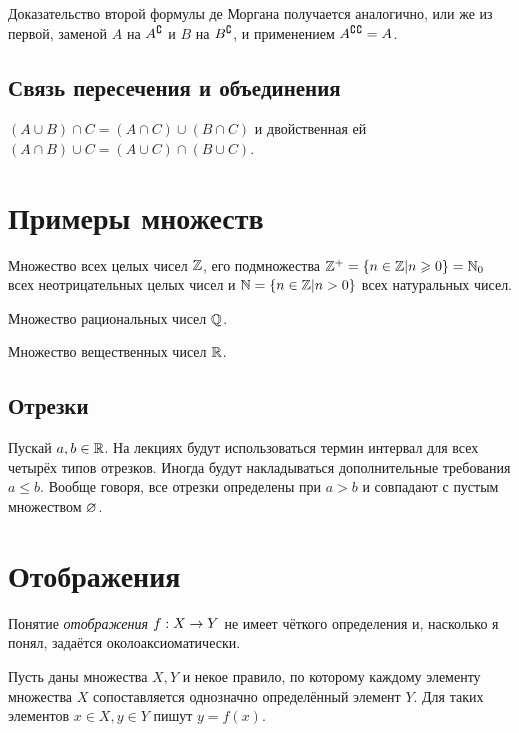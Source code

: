 \documentclass[a4paper]{report}
\begin{document}
    Доказательство второй формулы де Моргана получается аналогично, или же из первой, заменой $A$ на $A{}^\complement$ и $B$ на $B{}^\complement$, и применением $A{}^\complement{}^\complement = A$.

    \subsection{Связь пересечения и объединения} $(A \cup B) \cap C = (A \cap C) \cup (B \cap C)$ и двойственная ей $(A \cap B) \cup C = (A \cup C) \cap (B \cup C)$.


    \section{Примеры множеств}

    Множество всех целых чисел $\mathbb{Z}$, его подмножества $\mathbb{Z}^+ = \{ n \in \mathbb{Z} | n \geqslant 0 \} = \mathbb{N}_0$ всех неотрицательных целых чисел и $\mathbb{N} = \{ n \in \mathbb{Z} | n > 0 \}$ всех натуральных чисел.

    Множество рациональных чисел $\mathbb{Q}$.

    Множество вещественных чисел $\mathbb{R}$.

    \subsection{Отрезки}

    Пускай $a, b \in \mathbb{R}$. 
    На лекциях будут использоваться термин интервал для всех четырёх типов отрезков.
    Иногда будут накладываться дополнительные требования $a \le b$.
    Вообще говоря, все отрезки определены при $a > b$ и совпадают с пустым множеством $\varnothing$.


    \section{Отображения}
    Понятие \emph{отображения} $f : X \rightarrow Y$ не имеет чёткого определения и, насколько я понял, задаётся околоаксиоматически.

    Пусть даны множества $X, Y$ и некое правило, по которому каждому элементу множества $X$ сопоставляется однозначно определённый элемент $Y$.
    Для таких элементов $x \in X, y \in Y$ пишут $y = f(x)$.
\end{document}
